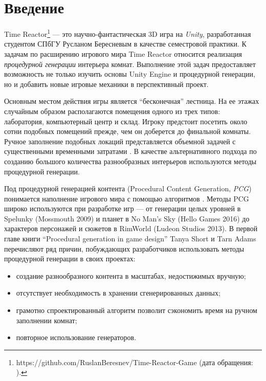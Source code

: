 
\section{Введение}
\thispagestyle{withCompileDate}

Time Reactor\footnote{https://github.com/RuslanBeresnev/Time-Reactor-Game (дата обращения: ).} --- это научно-фантастическая 3D игра на \textit{Unity}, разработанная студентом СПбГУ Русланом Бересневым в качестве семестровой практики. К задачам по расширению игрового мира Time Reactor относится реализация \textit{процедурной генерации} интерьера комнат.  Выполнение этой задач предоставляет возможность не только изучить основы Unity Engine и процедурной генерации, но и добавить новые игровые механики в перспективный проект.

Основным местом действия игры является \enquote{бесконечная} лестница. На ее этажах случайным образом располагаются помещения одного из трех типов: лаборатория, компьютерный центр и склад. Игроку предстоит посетить около сотни подобных помещений прежде, чем он доберется до финальной комнаты. Ручное заполнение подобных локаций представляется объемной задачей с существенными временными затратами \cite{short2017procedural}. В качестве альтернативного подхода по созданию большого количества разнообразных интерьеров используются методы процедурной генерации.
    
Под процедурной генерацией контента (Procedural Content Ge\-ne\-ra\-ti\-on, \textit{PCG}) понимается наполнение игрового мира с помощью алгоритмов \cite{article}. Методы PCG широко используются при разработке игр \cite{dahren2021usage} --- от генерации целых уровней в Spelunky (Mossmouth 2009) и планет
в No Man’s Sky (Hello Games 2016) до характеров персонажей и сюжетов в RimWorld (Ludeon Studios 2013). В первой главе книги \enquote{Procedural generation in game design} Tanya Short и Tarn Adams перечисляют ряд причин, побуждающих разработчиков использовать методы процедурной генерации в своих проектах:
\begin{itemize}
    \item создание разнообразного контента в масштабах, недостижимых вручную;
    \item отсутствует необходимость в хранении сгенерированных данных;
    \item грамотно спроектированный алгоритм позволит сэкономить время на ручном заполнении комнат;
    \item повторное использование генераторов.
\end{itemize}

